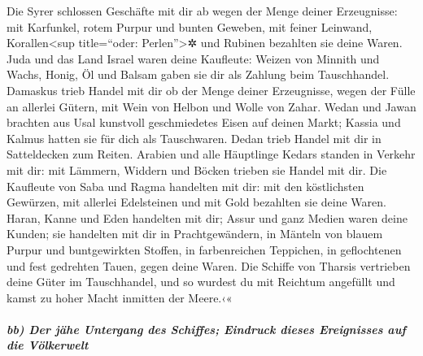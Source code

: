 Die Syrer schlossen Geschäfte mit dir ab wegen der Menge
deiner Erzeugnisse: mit Karfunkel, rotem Purpur und bunten Geweben, mit
feiner Leinwand, Korallen\textless sup title=``oder:
Perlen''\textgreater✲ und Rubinen bezahlten sie deine Waren.
Juda und das Land Israel waren deine Kaufleute: Weizen
von Minnith und Wachs, Honig, Öl und Balsam gaben sie dir als Zahlung
beim Tauschhandel. Damaskus trieb Handel mit dir ob der
Menge deiner Erzeugnisse, wegen der Fülle an allerlei Gütern, mit Wein
von Helbon und Wolle von Zahar. Wedan und Jawan brachten
aus Usal kunstvoll geschmiedetes Eisen auf deinen Markt; Kassia und
Kalmus hatten sie für dich als Tauschwaren. Dedan trieb
Handel mit dir in Satteldecken zum Reiten. Arabien und
alle Häuptlinge Kedars standen in Verkehr mit dir: mit Lämmern, Widdern
und Böcken trieben sie Handel mit dir. Die Kaufleute von
Saba und Ragma handelten mit dir: mit den köstlichsten Gewürzen, mit
allerlei Edelsteinen und mit Gold bezahlten sie deine Waren.
Haran, Kanne und Eden handelten mit dir; Assur und ganz
Medien waren deine Kunden; sie handelten mit dir in
Prachtgewändern, in Mänteln von blauem Purpur und buntgewirkten Stoffen,
in farbenreichen Teppichen, in geflochtenen und fest gedrehten Tauen,
gegen deine Waren. Die Schiffe von Tharsis vertrieben
deine Güter im Tauschhandel, und so wurdest du mit Reichtum angefüllt
und kamst zu hoher Macht inmitten der Meere.‹«

\hypertarget{bb-der-juxe4he-untergang-des-schiffes-eindruck-dieses-ereignisses-auf-die-vuxf6lkerwelt}{%
\subparagraph{bb) Der jähe Untergang des Schiffes; Eindruck dieses
Ereignisses auf die
Völkerwelt}\label{bb-der-juxe4he-untergang-des-schiffes-eindruck-dieses-ereignisses-auf-die-vuxf6lkerwelt}}

